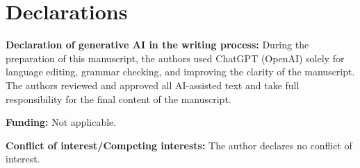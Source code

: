 \documentclass[pdflatex,sn-mathphys-ay]{sn-jnl}
\theoremstyle{thmstyleone}%
\theoremstyle{thmstyletwo}%
\theoremstyle{thmstylethree}%
\begin{document}

\section*{Declarations}

\noindent\textbf{Declaration of generative AI in the writing process:}
During the preparation of this manuscript, the authors used ChatGPT (OpenAI) solely for language editing, grammar checking, and improving the clarity of the manuscript. The authors reviewed and approved all AI-assisted text and take full responsibility for the final content of the manuscript.

\noindent\textbf{Funding:} Not applicable.

\noindent\textbf{Conflict of interest/Competing interests:} The author declares no conflict of interest.
\end{document}
